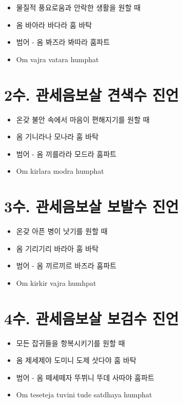 \documentclass[12pt, a4paper, oneside]{book}
\let\stdsection\section
\renewcommand\section{\newpage\stdsection}
\begin{document}
			\begin{itemize}
			\item 물질적 풍요로움과 안락한 생활을 원할 때
			\item 옴 바아라 바다라 훔 바탁
			\item 범어 - 옴 봐즈라 봐따라 훔파트
			\item Om vajra vatara humphat
			\end{itemize}





\section{2수. 관세음보살 견색수 진언 }

			\begin{itemize}
			\item 온갖 불안 속에서 마음이 편해지기를 원할 때
			\item 옴 기니라나 모나라 훔 바탁
			\item 범어 - 옴 끼를라라 모드라 훔파트 
			\item Om kirlara modra humphat
			\end{itemize}





\section{3수. 관세음보살 보발수 진언 }

			\begin{itemize}
			\item 온갖 아픈 병이 낫기를 원할 때
			\item 옴 기리기리 바라아 훔 바탁
			\item 범어 - 옴 끼르끼르 바즈라 훔파트
			\item Om kirkir vajra humhpat
			\end{itemize}




\section{4수. 관세음보살 보검수 진언}

			\begin{itemize}
			\item 모든 잡귀들을 항복시키기를 원할 때
			\item 옴 제세제야 도미니 도제 삿다야 훔 바탁
			\item 범어 - 옴 떼세떼자 뚜뷔니 뚜데 사따야 훔파트 
			\item Om teseteja tuvini tude satdhaya humphat
			\end{itemize}
\end{document}
